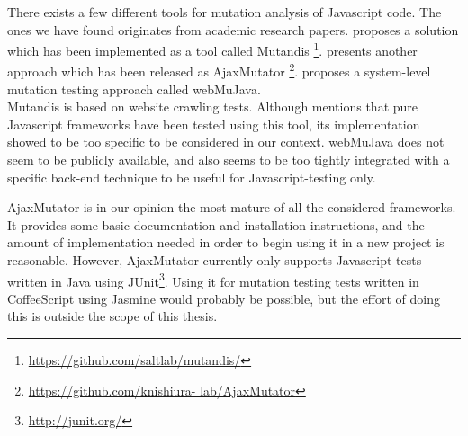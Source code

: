 There exists a few different tools for mutation analysis of Javascript
code. The ones we have found originates from academic research papers.
\citet{paper:mutandis} proposes a solution which has been implemented as
a tool called Mutandis
\footnote{\url{https://github.com/saltlab/mutandis/}}.
\citet{paper:ajaxmutator} presents another approach which has been
released as AjaxMutator \footnote{\url{https://github.com/knishiura-
lab/AjaxMutator}}. \citet{paper:webmujava} proposes a system-level
mutation testing approach called webMuJava.\\

Mutandis is based on website crawling tests. Although
\citeauthor{paper:mutandis} mentions that pure Javascript frameworks
have been tested using this tool, its implementation showed to be too
specific to be considered in our context. webMuJava does not seem to be
publicly available, and also seems to be too tightly integrated with a
specific back-end technique to be useful for Javascript-testing only.

AjaxMutator is in our opinion the most mature of all the considered
frameworks. It provides some basic documentation and installation
instructions, and the amount of implementation needed in order to begin
using it in a new project is reasonable. However, AjaxMutator currently
only supports Javascript tests written in Java using
JUnit\footnote{\url{http://junit.org/}}. Using it for mutation testing
tests written in CoffeeScript using Jasmine would probably be possible,
but the effort of doing this is outside the scope of this thesis.\\
